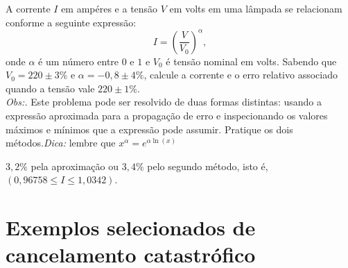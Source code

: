 \begin{exer} A corrente $I$ em ampéres e a tensão $V$ em volts em uma lâmpada se relacionam conforme a seguinte expressão:
  \begin{equation}
    I=\left(\frac{V}{V_0}\right)^\alpha,
  \end{equation}
onde $\alpha$ é um número entre $0$ e $1$ e $V_0$ é tensão nominal em volts. Sabendo que $V_0=220\pm 3\%$ e $\alpha=-0,8\pm 4\%$, calcule a corrente e o erro relativo associado quando a tensão vale $220\pm 1\%$.\\
\emph{Obs:.} Este problema pode ser resolvido de duas formas distintas: usando a expressão aproximada para a propagação de erro e inspecionando os valores máximos e mínimos que a expressão pode assumir. Pratique os dois métodos.\emph{Dica:} lembre que $x^\alpha=e^{\alpha \ln(x)}$
\end{exer}
\begin{resp}
  $3,2\%$ pela aproximação ou $3,4\%$ pelo segundo método, isto é, $\left(0,96758 \leq I\leq 1,0342\right)$.
\end{resp}




\section{Exemplos selecionados de cancelamento catastrófico}

